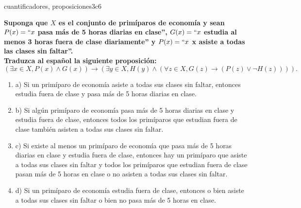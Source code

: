 \documentclass{article}
\begin{document}
\begin{question}{44}{cuantificadores, proposiciones}{3}{c}{6}{
\textbf{Suponga que $X$ es el conjunto de primíparos de economía y sean $P(x)=``x$ pasa más de 5 horas diarias en clase'', $G(x)=``x$ estudia al menos 3 horas fuera de clase diariamente'' y $P(x)=``x$ x asiste a todas las clases sin faltar''.}\\

\textbf{Traduzca al español la siguiente proposición:}
\[
(\exists x \in X, P(x) \land G(x)) \rightarrow (\exists y \in X, H(y) \land (\forall z \in X, G(z) \rightarrow (P(z) \lor \neg H(z)))).
\]

\begin{enumerate}
\item a) Si un primíparo de economía asiste a todas sus clases sin faltar, entonces estudia fuera de clase y pasa más de 5 horas diarias en clase.
\item b) Si algún primíparo de economía pasa más de 5 horas diarias en clase y estudia fuera de clase, entonces todos los primíparos que estudian fuera de clase también asisten a todas sus clases sin faltar.
\item c) Si existe al menos un primíparo de economía que pasa más de 5 horas diarias en clase y estudia fuera de clase, entonces hay un primíparo que asiste a todas sus clases sin faltar y todos los primíparos que estudian fuera de clase pasan más de 5 horas en clase o no asisten a todas sus clases sin faltar.
\item d) Si un primíparo de economía estudia fuera de clase, entonces o bien asiste a todas sus clases sin faltar o bien no pasa más de 5 horas en clase.
\end{enumerate}
}
\end{question}
\end{document}
